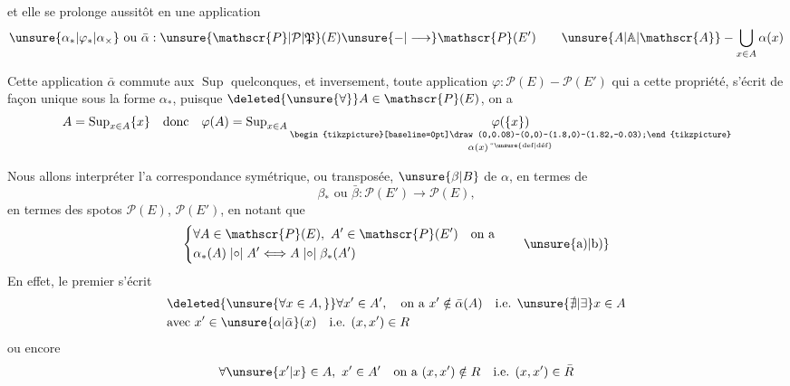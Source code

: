 
et elle se prolonge aussitôt en une application
\[
\unsure{\alpha_*|\varphi_*|\alpha_{\times}}\text{ ou }\bar\alpha:
\unsure{\mathscr{P}|\mathcal{P}|\mathfrak{P}}(E)\unsure{{-}|\longrightarrow}\mathscr{P}(E')
\qquad\unsure{A|\mathbb{A}|\mathscr{A}}\mathbin{-}\bigcup_{x\in A}\alpha(x)
\]

Cette application $\bar\alpha$ commute aux $\operatorname{Sup}$ quelconques, et inversement, toute application $\varphi:\mathscr{P}(E)\mathbin{-}\mathscr{P}(E')$ qui a cette propriété, s'écrit de façon unique sous la forme $\alpha_*$, puisque $\deleted{\unsure{\forall}}A\in\mathscr{P}(E)$, on a
\[
A=\operatorname{Sup}_{x\in A}\{x\}\quad\text{donc}\quad
\varphi(A)=\operatorname{Sup}_{x\in A}\underset{\alpha(x)\,{}^{\text{``\unsure{def|déf}}}}{\underset{\begin{tikzpicture}[baseline=0pt]\draw (0,0.08)--(0,0)--(1.8,0)--(1.82,-0.03);\end{tikzpicture}}{\varphi(\{x\})}}
\]

Nous allons interpréter l'a correspondance symétrique, ou transposée, $\unsure{\beta|B}$ de $\alpha$, en termes de
\[
\beta_*\text{ ou }\bar\beta:\mathscr{P}(E')\longrightarrow\mathscr{P}(E),
\]
en  termes des spotos $\mathscr{P}(E)$, $\mathscr{P}(E')$, en notant que
\begingroup
\makeatletter\tagsleft@true\makeatother
\[
\left\{\begin{aligned}
&\forall A\in\mathscr{P}(E),\ A'\in\mathscr{P}(E')\quad\text{on a}\\
&\alpha_*(A)\mathrel{|{\circ}|}A'\Longleftrightarrow A\mathrel{|{\circ}|}\beta_*(A')
\end{aligned}\right.
\tag*{\unsure{a)|b)}}
\]
\endgroup
En effet, le premier  s'écrit
\[
\begin{aligned}
&\deleted{\unsure{\forall x\in A,}}\forall x'\in A',\quad\text{on a }x'\notin\bar\alpha(A)\quad\text{i.e. }\unsure{\nexists|\exists}x\in A\\
&\text{avec }x'\in\unsure{\alpha|\bar\alpha}(x)\quad\text{i.e. }(x,x')\in R
\end{aligned}
\]
ou encore
\[
\forall\unsure{x'|x}\in A,\ x'\in A'\quad\text{on a }(x,x')\notin R\quad\text{i.e. }(x,x')\in\bar R
\]
